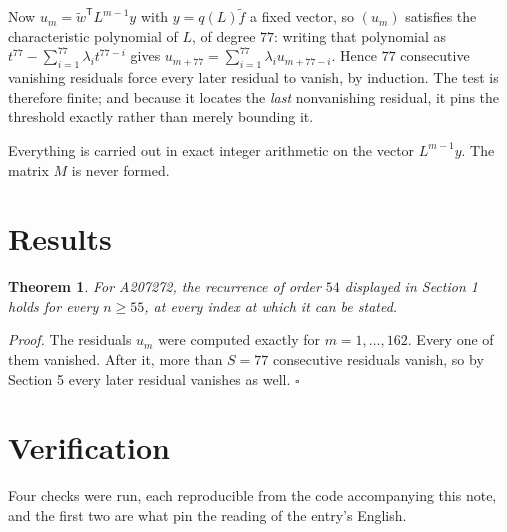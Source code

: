 \documentclass[11pt]{article}
\newtheorem{theorem}{Theorem}
\theoremstyle{definition}
\begin{document}
Now $u_m = \tilde w^{\mathsf T} L^{m-1} y$ with $y = q(L)\tilde f$ a fixed vector, so $(u_m)$ satisfies the characteristic polynomial of $L$, of degree $77$: writing that polynomial as $t^{77} - \sum_{i=1}^{77} \lambda_i t^{77-i}$ gives $u_{m+77} = \sum_{i=1}^{77} \lambda_i u_{m+77-i}$. Hence $77$ consecutive vanishing residuals force every later residual to vanish, by induction. The test is therefore finite; and because it locates the {\itshape last} nonvanishing residual, it pins the threshold exactly rather than merely bounding it.

Everything is carried out in exact integer arithmetic on the vector $L^{m-1}y$. The matrix $M$ is never formed.

\section{Results}

\begin{theorem} For A207272, the recurrence of order $54$ displayed in Section 1 holds for every $n \ge 55$, at every index at which it can be stated.\end{theorem}

{\itshape Proof.} The residuals $u_m$ were computed exactly for $m = 1,\dots,162$. Every one of them vanished. After it, more than $S = 77$ consecutive residuals vanish, so by Section 5 every later residual vanishes as well. $\square$

\section{Verification}

Four checks were run, each reproducible from the code accompanying this note, and the first two are what pin the reading of the entry's English.
\end{document}
